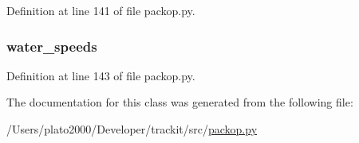 Definition at line 141 of file packop.\+py.

\subsubsection[{\texorpdfstring{water\+\_\+speeds}{water_speeds}}]{\setlength{\rightskip}{0pt plus 5cm}water\+\_\+speeds}\hypertarget{classsrc_1_1packop_1_1_package_a4fd9fe5f73cb34aa5b5c7029f024d4f6}{}\label{classsrc_1_1packop_1_1_package_a4fd9fe5f73cb34aa5b5c7029f024d4f6}


Definition at line 143 of file packop.\+py.



The documentation for this class was generated from the following file\+:\begin{DoxyCompactItemize}
\item 
/\+Users/plato2000/\+Developer/trackit/src/\hyperlink{packop_8py}{packop.\+py}\end{DoxyCompactItemize}

